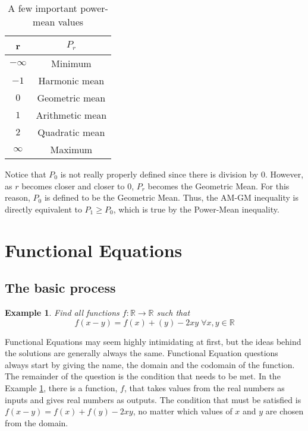 \documentclass[a4paper,12pt]{article}
\newtheorem{example}{Example}[section]
\begin{document}
\begin{table}[ht]
    \caption{A few important power-mean values}
    \centering
\begin{tabular}{|c|c|}
\hline
r                         & $P_r$            \\
\hline
$-\infty$                 & Minimum         \\
\hline
$-1$                      & Harmonic mean   \\
\hline
$0$                       & Geometric mean  \\
\hline
$1$                       & Arithmetic mean \\
\hline
$2$                       & Quadratic mean  \\
\hline
$\infty$                  & Maximum \\
\hline       
\end{tabular}
\end{table}

Notice that $P_0$ is not really properly defined since there is division by $0$. However, as $r$ becomes closer and closer to $0$, $P_r$ becomes the Geometric Mean. For this reason, $P_0$ is defined to be the Geometric Mean. Thus, the AM-GM inequality is directly equivalent to $P_1 \geq P_0$, which is true by the Power-Mean inequality.

\clearpage

\section{Functional Equations}
\subsection{The basic process}
\begin{example}
    \label{funcex}
    Find all functions $f: \mathbb{R} \rightarrow \mathbb{R}$ such that $$f(x - y) = f(x) + (y) - 2xy\; \forall x, y \in \mathbb{R}$$
\end{example}

Functional Equations may seem highly intimidating at first, but the ideas behind the solutions are generally always the same.
Functional Equation questions always start by giving the name, the domain and the codomain of the function. The remainder of the question is the condition that needs to be met.
In the Example \ref{funcex}, there is a function, $f$, that takes values from the real numbers as inputs and gives real numbers as outputs. The condition that must be satisfied is $f(x - y) = f(x) + f(y) - 2xy$, no matter which values of $x$ and $y$ are chosen from the domain. \\
\end{document}
